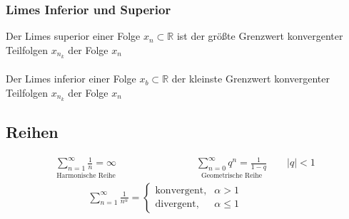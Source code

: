 \documentclass[6pt,a4paper]{scrartcl}
\begin{document}
\begin{multicols*}{4}
\subsubsection{Limes Inferior und Superior}
Der Limes superior einer Folge $x_n \subset \mathbb{R}$ ist der größte Grenzwert konvergenter Teilfolgen $x_{n_k}$ der Folge ${x_n}$ \\ \\
Der Limes inferior einer Folge $x_b \subset \mathbb{R}$ der kleinste Grenzwert konvergenter Teilfolgen $x_{n_k}$ der Folge $x_n$


\subsection{Reihen}
\begin{eqnarray*}
	\underset{\text{Harmonische Reihe}}{\sum_{n=1}^\infty \frac{1}{n} = \infty} \qquad \qquad  \qquad \qquad \underset{\text{Geometrische Reihe}}{\sum_{n=0}^\infty q^n = \frac{1}{1-q}} \qquad |q|<1
\end{eqnarray*}
\begin{eqnarray*}
	\sum_{n=1}^\infty \frac{1}{n^\alpha} = \begin{cases} \text{konvergent}, & \alpha > 1 \\ \text{divergent}, & \alpha \le 1 \end{cases} \qquad \qquad
\end{eqnarray*}




\end{multicols*}
\end{document}
